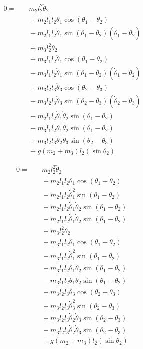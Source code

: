 \documentclass[11pt,a4paper]{article}
\begin{document}
\begin{align*}
  0 =&\quad m_2 l_2^2 \ddot{\theta}_2 \\
    &\quad + m_2 l_1 l_2 \ddot{\theta}_1 \cos(\theta_1 - \theta_2) \\
    &\quad - m_2 l_1 l_2 \dot{\theta}_1 \sin(\theta_1 - \theta_2)(\dot{\theta}_1 - \dot{\theta}_2) \\
    &\quad + m_3 l_2^2 \ddot{\theta}_2 \\
    &\quad + m_3 l_1 l_2 \ddot{\theta}_1 \cos(\theta_1 - \theta_2) \\
    &\quad - m_3 l_1 l_2 \dot{\theta}_1 \sin(\theta_1 - \theta_2)(\dot{\theta}_1 - \dot{\theta}_2) \\
    &\quad + m_3 l_2 l_3 \ddot{\theta}_3 \cos(\theta_2 - \theta_3) \\
    &\quad - m_3 l_2 l_3 \dot{\theta}_3 \sin(\theta_2 - \theta_3)(\dot{\theta}_2 - \dot{\theta}_3) \\
    &\quad - m_2 l_1 l_2 \dot{\theta}_1 \dot{\theta}_2 \sin(\theta_1 - \theta_2) \\
    &\quad - m_3 l_1 l_2 \dot{\theta}_1 \dot{\theta}_2 \sin(\theta_1 - \theta_2) \\
    &\quad + m_3 l_2 l_3 \dot{\theta}_2 \dot{\theta}_3 \sin(\theta_2 - \theta_3) \\
    &\quad + g (m_2 + m_3) l_2 (\sin\theta_2)
\end{align*}

\begin{align*}
  0 =&\quad m_2 l_2^2 \ddot{\theta}_2 \\
    &\quad + m_2 l_1 l_2 \ddot{\theta}_1 \cos(\theta_1 - \theta_2) \\
    &\quad - m_2 l_1 l_2 \dot{\theta}_1^2 \sin(\theta_1 - \theta_2) \\
    &\quad + m_2 l_1 l_2 \dot{\theta}_1 \dot{\theta}_2 \sin(\theta_1 - \theta_2) \\
    &\quad - m_2 l_1 l_2 \dot{\theta}_1 \dot{\theta}_2 \sin(\theta_1 - \theta_2) \\
    &\quad + m_3 l_2^2 \ddot{\theta}_2 \\
    &\quad + m_3 l_1 l_2 \ddot{\theta}_1 \cos(\theta_1 - \theta_2) \\
    &\quad - m_3 l_1 l_2 \dot{\theta}_1^2 \sin(\theta_1 - \theta_2) \\
    &\quad + m_3 l_1 l_2 \dot{\theta}_1 \dot{\theta}_2 \sin(\theta_1 - \theta_2) \\
    &\quad - m_3 l_1 l_2 \dot{\theta}_1 \dot{\theta}_2 \sin(\theta_1 - \theta_2) \\
    &\quad + m_3 l_2 l_3 \ddot{\theta}_3 \cos(\theta_2 - \theta_3) \\
    &\quad + m_3 l_2 l_3 \dot{\theta}_3^2 \sin(\theta_2 - \theta_3) \\
    &\quad + m_3 l_2 l_3 \dot{\theta}_2 \dot{\theta}_3 \sin(\theta_2 - \theta_3) \\
    &\quad - m_3 l_2 l_3 \dot{\theta}_2 \dot{\theta}_3 \sin(\theta_2 - \theta_3) \\
    &\quad + g (m_2 + m_3) l_2 (\sin\theta_2)
\end{align*}
\end{document}
